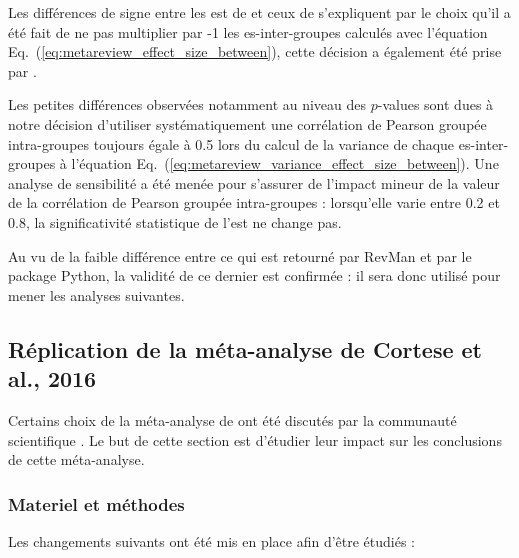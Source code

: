 Les différences de signe entre les \gls{est} de \citet{Cortese2016} et ceux de \citet{Bussalb2019clinical} s'expliquent par le choix qu'il a été fait de ne pas multiplier
par -1 les \gls{es}-inter-groupes calculés avec l'équation Eq.~(\ref{eq:metareview_effect_size_between}), cette décision a également été prise par 
\citet{Micoulaud2014}.

Les petites différences observées notamment au niveau des $p$-values sont dues à notre décision d'utiliser systématiquement une corrélation de Pearson groupée intra-groupes
toujours égale à 0.5 \citep{Balk2012} lors du calcul de la variance de chaque \gls{es}-inter-groupes à l'équation 
Eq.~(\ref{eq:metareview_variance_effect_size_between}). Une analyse de sensibilité a été menée pour s'assurer de l'impact mineur de la valeur de la corrélation de Pearson groupée 
intra-groupes : lorsqu'elle varie entre 0.2 et 0.8, la significativité statistique de l'\gls{est} ne change pas.

Au vu de la faible différence entre ce qui est retourné par RevMan et par le package Python, la validité de ce dernier est confirmée : il sera donc utilisé pour mener
les analyses suivantes.

\subsection{Réplication de la méta-analyse de Cortese et al., 2016} \label{replication}

Certains choix de la méta-analyse de \citet{Cortese2016} ont été discutés par la communauté scientifique \citep{Micoulaud2016}. Le but de cette section est 
d'étudier leur impact sur les conclusions de cette méta-analyse.

\subsubsection{Materiel et méthodes}
Les changements suivants ont été mis en place afin d'être étudiés :

